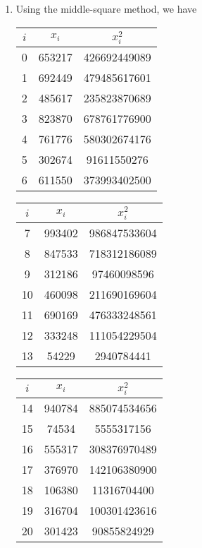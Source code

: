 \documentclass[10pt]{report}
\begin{document}
\begin{enumerate}
	\item 
	Using the middle-square method, we have
	\begin{table}[H]
		\centering
		\begin{minipage}{.3\linewidth}
			\centering
			\begin{tabular}{*{3}{c}} 
				\toprule
				$i$ & $x_i$ & $x_i^2$ \\ \midrule
				0 & 653217 & 426692449089 \\ \midrule
				1 & 692449 & 479485617601 \\ \midrule
				2 & 485617 & 235823870689 \\ \midrule
				3 & 823870 & 678761776900 \\ \midrule
				4 & 761776 & 580302674176 \\ \midrule
				5 & 302674 & 91611550276 \\ \midrule
				6 & 611550 & 373993402500 \\
				\bottomrule
			\end{tabular}
		\end{minipage}
		\hspace{-2ex}
		\begin{minipage}{.3\linewidth}
			\centering
			\begin{tabular}{*{3}{c}} 
				\toprule
				$i$ & $x_i$ & $x_i^2$ \\ \midrule
				7 & 993402 & 986847533604 \\ \midrule
				8 & 847533 & 718312186089 \\ \midrule
				9 & 312186 & 97460098596 \\ \midrule
				10 & 460098 & 211690169604 \\ \midrule
				11 & 690169 & 476333248561 \\ \midrule
				12 & 333248 & 111054229504 \\ \midrule
				13 & 54229 & 2940784441 \\ 
				\bottomrule
			\end{tabular}
		\end{minipage}
		\hspace{-2ex}
		\begin{minipage}{.3\linewidth}
			\centering
			\begin{tabular}{*{3}{c}} 
				\toprule
				$i$ & $x_i$ & $x_i^2$ \\ \midrule
				14 & 940784 & 885074534656 \\ \midrule
				15 & 74534 & 5555317156 \\ \midrule
				16 & 555317 & 308376970489 \\ \midrule
				17 & 376970 & 142106380900 \\ \midrule
				18 & 106380 & 11316704400 \\ \midrule
				19 & 316704 & 100301423616 \\ \midrule
				20 & 301423 & 90855824929 \\ 
				\bottomrule
			\end{tabular}
		\end{minipage}
	\end{table}
	

\end{enumerate}
\end{document}
